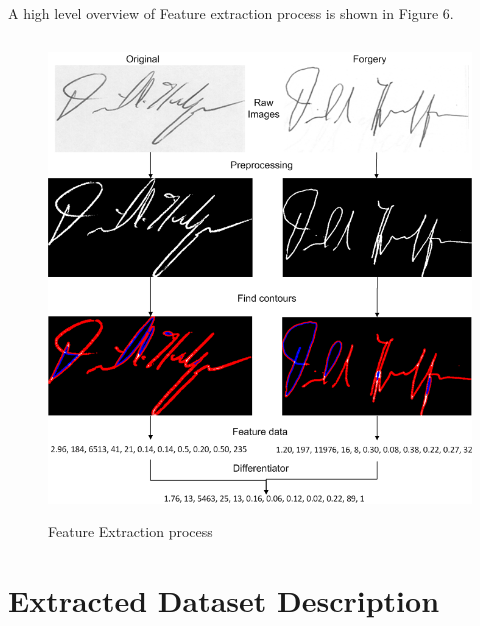 \documentclass{article}
\begin{document}
A high level overview of Feature extraction process is shown in Figure 6.

\begin{figure}[h]
\begin{center}
\includegraphics[width=5in,height=5in]{ImageProcessing.PNG}
\end{center}
\caption{Feature Extraction process}
\end{figure}


\section{Extracted Dataset Description}
\end{document}

